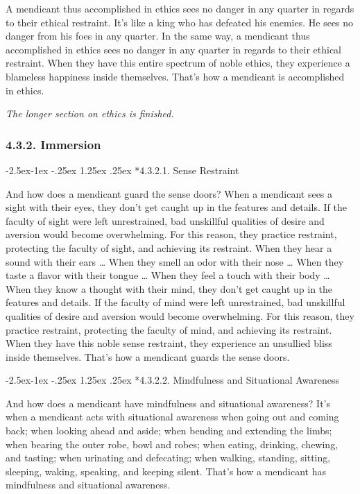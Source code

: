 \documentclass[12pt,openany]{book}%
\makeatletter
\renewcommand\paragraph{\@startsection{paragraph}{4}{\z@}%
            {-2.5ex\@plus -1ex \@minus -.25ex}%
            {1.25ex \@plus .25ex}%
            {\noindent\Semiboldnormalfont\normalsize}}
\newcommand*{\scendsection}[1]{\begin{center}\textit{#1}\end{center}}
\makeatother
\begin{document}
A mendicant thus accomplished in ethics sees no danger in any quarter in regards to their ethical restraint. It’s like a king who has defeated his enemies. He sees no danger from his foes in any quarter. In the same way, a mendicant thus accomplished in ethics sees no danger in any quarter in regards to their ethical restraint. When they have this entire spectrum of noble ethics, they experience a blameless happiness inside themselves. That’s how a mendicant is accomplished in ethics. 

\scendsection{The longer section on ethics is finished. }

\subsubsection*{4.3.2. Immersion }

\paragraph*{4.3.2.1. Sense Restraint }

And how does a mendicant guard the sense doors? When a mendicant sees a sight with their eyes, they don’t get caught up in the features and details. If the faculty of sight were left unrestrained, bad unskillful qualities of desire and aversion would become overwhelming. For this reason, they practice restraint, protecting the faculty of sight, and achieving its restraint. When they hear a sound with their ears … When they smell an odor with their nose … When they taste a flavor with their tongue … When they feel a touch with their body … When they know a thought with their mind, they don’t get caught up in the features and details. If the faculty of mind were left unrestrained, bad unskillful qualities of desire and aversion would become overwhelming. For this reason, they practice restraint, protecting the faculty of mind, and achieving its restraint. When they have this noble sense restraint, they experience an unsullied bliss inside themselves. That’s how a mendicant guards the sense doors. 

\paragraph*{4.3.2.2. Mindfulness and Situational Awareness }

And how does a mendicant have mindfulness and situational awareness? It’s when a mendicant acts with situational awareness when going out and coming back; when looking ahead and aside; when bending and extending the limbs; when bearing the outer robe, bowl and robes; when eating, drinking, chewing, and tasting; when urinating and defecating; when walking, standing, sitting, sleeping, waking, speaking, and keeping silent. That’s how a mendicant has mindfulness and situational awareness. 
\end{document}
